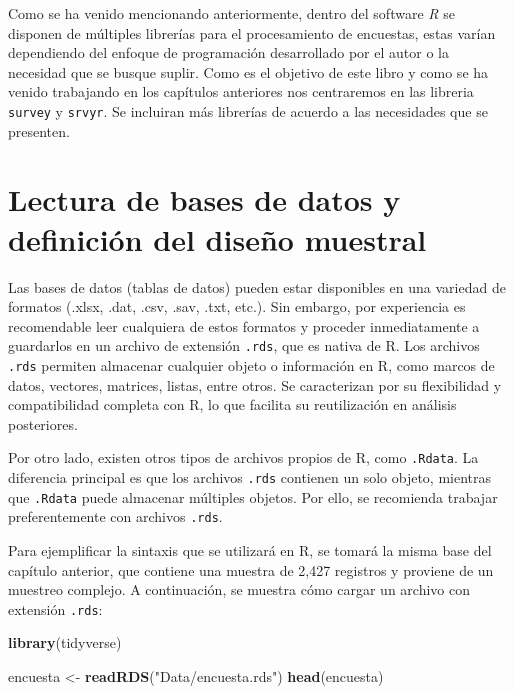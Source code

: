 \documentclass[
  spanish,
  12pt,
]{book}
\newenvironment{Shaded}{\begin{snugshade}}{\end{snugshade}}
\newcommand{\FunctionTok}[1]{\textcolor[rgb]{0.13,0.29,0.53}{\textbf{#1}}}
\newcommand{\NormalTok}[1]{#1}
\newcommand{\OtherTok}[1]{\textcolor[rgb]{0.56,0.35,0.01}{#1}}
\newcommand{\StringTok}[1]{\textcolor[rgb]{0.31,0.60,0.02}{#1}}
\begin{document}
Como se ha venido mencionando anteriormente, dentro del software \emph{R} se disponen de múltiples librerías para el procesamiento de encuestas, estas varían dependiendo del enfoque de programación desarrollado por el autor o la necesidad que se busque suplir. Como es el objetivo de este libro y como se ha venido trabajando en los capítulos anteriores nos centraremos en las libreria \texttt{survey} y \texttt{srvyr}. Se incluiran más librerías de acuerdo a las necesidades que se presenten.

\section{Lectura de bases de datos y definición del diseño muestral}\label{lectura-de-bases-de-datos-y-definiciuxf3n-del-diseuxf1o-muestral}

Las bases de datos (tablas de datos) pueden estar disponibles en una variedad de formatos (.xlsx, .dat, .csv, .sav, .txt, etc.). Sin embargo, por experiencia es recomendable leer cualquiera de estos formatos y proceder inmediatamente a guardarlos en un archivo de extensión \texttt{.rds}, que es nativa de R. Los archivos \texttt{.rds} permiten almacenar cualquier objeto o información en R, como marcos de datos, vectores, matrices, listas, entre otros. Se caracterizan por su flexibilidad y compatibilidad completa con R, lo que facilita su reutilización en análisis posteriores.

Por otro lado, existen otros tipos de archivos propios de R, como \texttt{.Rdata}. La diferencia principal es que los archivos \texttt{.rds} contienen un solo objeto, mientras que \texttt{.Rdata} puede almacenar múltiples objetos. Por ello, se recomienda trabajar preferentemente con archivos \texttt{.rds}.

Para ejemplificar la sintaxis que se utilizará en R, se tomará la misma base del capítulo anterior, que contiene una muestra de 2,427 registros y proviene de un muestreo complejo. A continuación, se muestra cómo cargar un archivo con extensión \texttt{.rds}:

\begin{Shaded}
\begin{Highlighting}[]
\FunctionTok{library}\NormalTok{(tidyverse)}

\NormalTok{encuesta }\OtherTok{\textless{}{-}} \FunctionTok{readRDS}\NormalTok{(}\StringTok{"Data/encuesta.rds"}\NormalTok{)}
\FunctionTok{head}\NormalTok{(encuesta)}
\end{Highlighting}
\end{Shaded}
\end{document}
